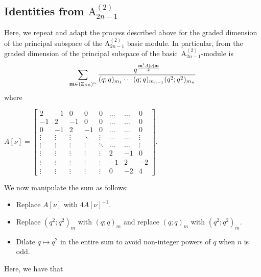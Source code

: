 \documentclass[ALCO,Unicode,published]{cedram}
\begin{document}
\subsection{Identities from \texorpdfstring{$\mathrm{A}_{2n-1}^{(2)}$}{A\_{2n-1}\^{(2)}}}

Here, we repeat and adapt the process described above for the graded dimension of the principal subspace of the  \texorpdfstring{$\mathrm{A}_{2n-1}^{(2)}$}{A\_{2n-1}\^{(2)}} basic module. In particular, from \cite{PSW} the graded dimension of the principal subspace of the basic~\texorpdfstring{$\mathrm{A}_{2n-1}^{(2)}$}{A\_{2n-1}\^{(2)}}-module is
$$
\sum_{{\bf m} \in (\mathbb{Z}_{\ge 0})^n} \frac{q^{\frac{{\bf m}^t A[\nu] {\bf m}}{2}}}{(q;q)_{m_1} \cdots (q;q)_{m_{n-1}}(q^2; q^2)_{m_n}}
$$
where
\begin{center}
$
A[\nu] = \begin{bmatrix}
    2      & -1     & 0      & 0      & 0      & \ldots & \ldots & 0\\
    -1     &  2     & -1     & 0      & 0      & \ldots & \ldots & 0\\
    0      & -1     &  2     & -1     & 0      & \ldots & \ldots & 0\\
    \vdots & \vdots & \vdots & \ddots & \vdots & \ldots & \ldots & \vdots \\
    \vdots & \vdots & \vdots & \vdots & \ddots & \ldots & \ldots & \vdots \\
    \vdots & \vdots & \vdots & \vdots & \vdots & 2      & -1     & 0 \\
    \vdots & \vdots & \vdots & \vdots & \vdots & -1     & 2      & -2 \\
    \vdots & \vdots & \vdots & \vdots & \vdots & 0      & -2     & 4 
\end{bmatrix}.$\\
\end{center}
We now manipulate the sum as follows:
\begin{itemize}
\item Replace $A[\nu]$ with $4A[\nu]^{-1}$.
\item Replace $(q^2;q^2)_m$ with $(q;q)_m$ and replace $(q;q)_m$ with $(q^2;q^2)_m$.
\item Dilate $q\mapsto q^2$ in the entire sum to avoid non-integer powers of $q$ when $n$ is odd.
\end{itemize}
Here, we have that 
\end{document}
